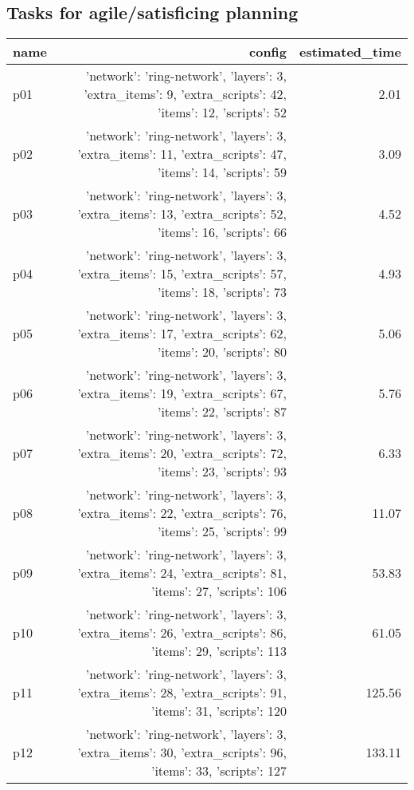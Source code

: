 \documentclass{article}
\begin{document}
                                \subsection*{Tasks for agile/satisficing planning}
                                
                            \begin{center}
                            \scriptsize
                            \begin{tabular}{@{}l|r|r@{}}
                            name & config & estimated\_time\\\midrule
                              p01&{'network': 'ring-network', 'layers': 3, 'extra\_items': 9, 'extra\_scripts': 42, 'items': 12, 'scripts': 52}&2.01\\
  p02&{'network': 'ring-network', 'layers': 3, 'extra\_items': 11, 'extra\_scripts': 47, 'items': 14, 'scripts': 59}&3.09\\
  p03&{'network': 'ring-network', 'layers': 3, 'extra\_items': 13, 'extra\_scripts': 52, 'items': 16, 'scripts': 66}&4.52\\
  p04&{'network': 'ring-network', 'layers': 3, 'extra\_items': 15, 'extra\_scripts': 57, 'items': 18, 'scripts': 73}&4.93\\
  p05&{'network': 'ring-network', 'layers': 3, 'extra\_items': 17, 'extra\_scripts': 62, 'items': 20, 'scripts': 80}&5.06\\
  p06&{'network': 'ring-network', 'layers': 3, 'extra\_items': 19, 'extra\_scripts': 67, 'items': 22, 'scripts': 87}&5.76\\
  p07&{'network': 'ring-network', 'layers': 3, 'extra\_items': 20, 'extra\_scripts': 72, 'items': 23, 'scripts': 93}&6.33\\
  p08&{'network': 'ring-network', 'layers': 3, 'extra\_items': 22, 'extra\_scripts': 76, 'items': 25, 'scripts': 99}&11.07\\
  p09&{'network': 'ring-network', 'layers': 3, 'extra\_items': 24, 'extra\_scripts': 81, 'items': 27, 'scripts': 106}&53.83\\
  p10&{'network': 'ring-network', 'layers': 3, 'extra\_items': 26, 'extra\_scripts': 86, 'items': 29, 'scripts': 113}&61.05\\
  p11&{'network': 'ring-network', 'layers': 3, 'extra\_items': 28, 'extra\_scripts': 91, 'items': 31, 'scripts': 120}&125.56\\
  p12&{'network': 'ring-network', 'layers': 3, 'extra\_items': 30, 'extra\_scripts': 96, 'items': 33, 'scripts': 127}&133.11\\

\end{tabular}
\end{center}
\end{document}
